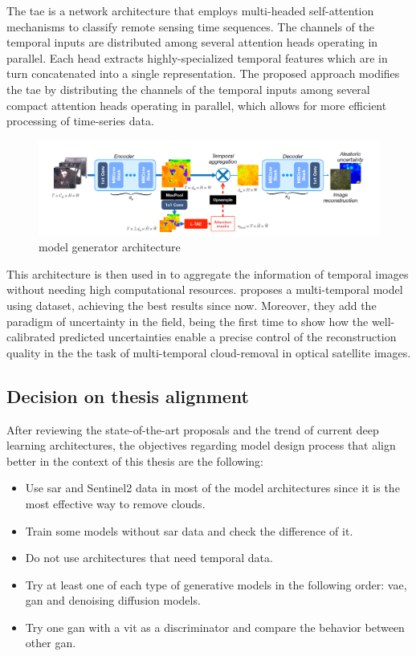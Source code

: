 \documentclass[11pt, a4paper]{article}
\begin{document}
	The  \gls{tae} is a network architecture that employs multi-headed self-attention mechanisms to classify remote sensing time sequences. The channels of the temporal inputs are distributed among several attention heads operating in parallel. Each head extracts highly-specialized temporal features which are in turn concatenated into a single representation. The proposed approach modifies the \gls{tae} by distributing the channels of the temporal inputs among several compact attention heads operating in parallel, which allows for more efficient processing of time-series data. 
	\begin{figure}[H]
		\centering
		\includegraphics[width=15cm]{imgs/relatedwork/uncertainty}
		\caption{\cite{uncrtaints2021ebel} model generator architecture}
	\end{figure}
	This architecture is then used in \cite{uncrtaints2021ebel} to aggregate the information of temporal images without needing high computational resources. \cite{uncrtaints2021ebel} proposes a multi-temporal model using \cite{sen12mscrts} dataset, achieving the best results since now. Moreover, they add the paradigm of uncertainty in the field, being the first time to show how the well-calibrated predicted uncertainties
	enable a precise control of the reconstruction quality in the the task of multi-temporal
	cloud-removal in optical satellite images.

	\subsection{Decision on thesis alignment}
	After reviewing the state-of-the-art proposals and the trend of current deep learning architectures, the objectives regarding model design process that align better in the context of this thesis are the following:
	\begin{itemize}
		\item Use \gls{sar} and Sentinel2 data in most of the model architectures since it is the most effective way to remove clouds.
		\item Train some models without \gls{sar} data and check the difference of it.
		\item Do not use architectures that need temporal data.
		\item Try at least one of each type of generative models in the following order: \gls{vae}, \gls{gan} and denoising diffusion models.
		\item Try one \gls{gan} with a \gls{vit} as a discriminator and compare the behavior between other \gls{gan}.
	\end{itemize}
\end{document}
